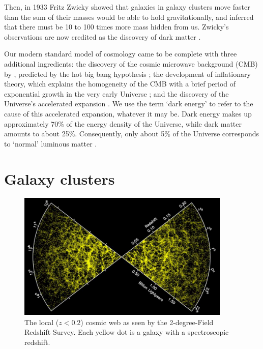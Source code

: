 Then, in 1933 Fritz Zwicky showed that galaxies in galaxy clusters move faster than the sum of their masses would be able to hold gravitationally, and inferred that there must be 10 to 100 times more mass hidden from us. Zwicky's observations are now credited as the discovery of dark matter \citep[e.g.,][]{trimble87,einasto13}.

Our modern standard model of cosmology came to be complete with three additional ingredients: the discovery of the cosmic microwave background (CMB) by \cite{penzias65}, predicted by the hot big bang hypothesis \citep{dicke65}; the development of inflationary theory, which explains the homogeneity of the CMB with a brief period of exponential growth in the very early Universe \citep{guth81}; and the discovery of the Universe's accelerated expansion \citep{riess98,perlmutter99}. We use the term `dark energy' to refer to the cause of this accelerated expansion, whatever it may be. Dark energy makes up approximately 70\% of the energy density of the Universe, while dark matter amounts to about 25\%. Consequently, only about 5\% of the Universe corresponds to `normal' luminous matter \citep{planck15xiii}.


\section{Galaxy clusters}

\begin{figure}
 \centerline{\includegraphics[width=4in]{chapter1/web_2df.jpg}}
\caption{The local ($z<0.2$) cosmic web as seen by the 2-degree-Field Redshift Survey. Each yellow dot is a galaxy with a spectroscopic redshift.}
\label{f:intro_web}
\end{figure}


